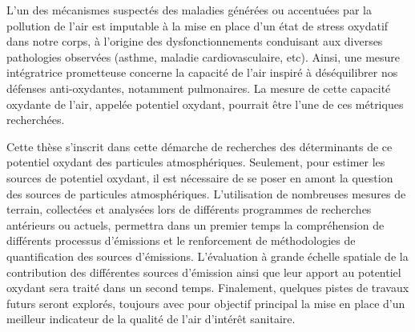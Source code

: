 L'un des mécanismes suspectés des maladies générées ou accentuées par la pollution de l'air
est imputable à la mise en place d'un état de stress oxydatif dans notre corps, à l'origine des
dysfonctionnements conduisant aux diverses pathologies observées (asthme, maladie
cardiovasculaire, etc). Ainsi, une mesure intégratrice prometteuse concerne la capacité de
l'air inspiré à déséquilibrer nos défenses anti-oxydantes, notamment pulmonaires.
La mesure de cette capacité oxydante de l'air, appelée potentiel oxydant, pourrait être
l'une de ces métriques recherchées.

Cette thèse s'inscrit dans cette démarche de recherches des déterminants de ce potentiel
oxydant des particules atmosphériques. Seulement, pour estimer les sources de potentiel
oxydant, il est nécessaire de se poser en amont la question des sources de particules
atmosphériques. L'utilisation de nombreuses mesures de terrain, collectées et analysées
lors de différents programmes de recherches antérieurs ou actuels, permettra dans un
premier temps la compréhension de différents processus d'émissions et le renforcement de
méthodologies de quantification des sources d'émissions. L'évaluation à grande échelle
spatiale de la contribution des différentes sources d'émission ainsi que leur apport au
potentiel oxydant sera traité dans un second temps. Finalement, quelques pistes de
travaux futurs seront explorés, toujours avec pour objectif principal la mise en place
d'un meilleur indicateur de la qualité de l'air d'intérêt sanitaire.


